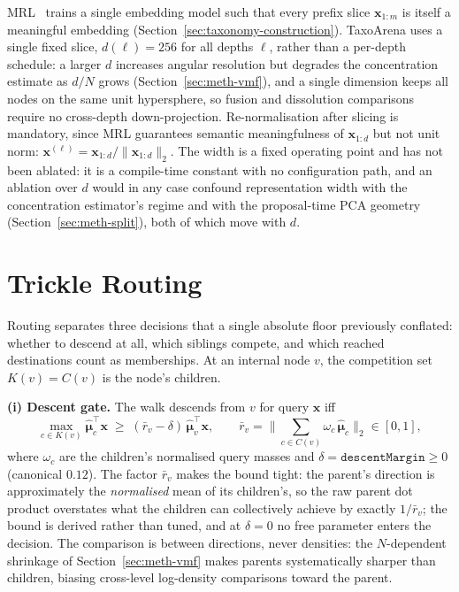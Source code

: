 MRL~\parencite{kusupati2022mrl} trains a single embedding model such that every prefix
slice $\mathbf{x}_{1:m}$ is itself a meaningful embedding
(Section~\ref{sec:taxonomy-construction}).
TaxoArena uses a single fixed slice, $d(\ell) = 256$ for all depths $\ell$, rather than a
per-depth schedule: a larger $d$ increases angular resolution but degrades the
concentration estimate as $d/N$ grows (Section~\ref{sec:meth-vmf}), and a single
dimension keeps all nodes on the same unit hypersphere, so fusion and dissolution
comparisons require no cross-depth down-projection.
Re-normalisation after slicing is mandatory, since MRL guarantees semantic meaningfulness
of $\mathbf{x}_{1:d}$ but not unit norm:
$\mathbf{x}^{(\ell)} = \mathbf{x}_{1:d} / \|\mathbf{x}_{1:d}\|_2$.
The width is a fixed operating point and has not been ablated: it is a compile-time
constant with no configuration path, and an ablation over $d$ would in any case confound
representation width with the concentration estimator's regime and with the
proposal-time PCA geometry (Section~\ref{sec:meth-split}), both of which move with $d$.

\section{Trickle Routing}\label{sec:meth-routing}

Routing separates three decisions that a single absolute floor previously conflated:
whether to descend at all, which siblings compete, and which reached destinations count
as memberships.
At an internal node $v$, the competition set $K(v) = C(v)$ is the node's children.

\textbf{(i) Descent gate.}
The walk descends from $v$ for query $\mathbf{x}$ iff
\[
\max_{c \in K(v)}
\hat{\boldsymbol{\mu}}_c^\top \mathbf{x}
\;\geq\;
(\bar{r}_v - \delta)\,
\hat{\boldsymbol{\mu}}_v^\top \mathbf{x},
\qquad
\bar{r}_v
= \Big\| \sum_{c \in C(v)} \omega_c\, \hat{\boldsymbol{\mu}}_c \Big\|_2
\in [0,1],
\]
where $\omega_c$ are the children's normalised query masses and
$\delta = \texttt{descentMargin} \geq 0$ (canonical $0.12$).
The factor $\bar{r}_v$ makes the bound tight: the parent's direction is approximately
the \emph{normalised} mean of its children's, so the raw parent dot product overstates
what the children can collectively achieve by exactly $1/\bar{r}_v$; the bound is
derived rather than tuned, and at $\delta = 0$ no free parameter enters the decision.
The comparison is between directions, never densities: the $N$-dependent shrinkage of
Section~\ref{sec:meth-vmf} makes parents systematically sharper than children, biasing
cross-level log-density comparisons toward the parent.

